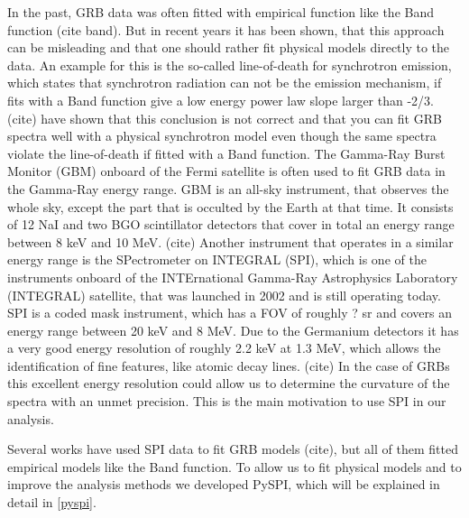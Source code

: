 \documentclass[twocolumn]{aa}
\begin{document}
In the past, GRB data was often fitted with empirical function like the Band function (cite band). But in recent years it has been shown, that this approach can be misleading and that one should rather fit physical models directly to the data. An example for this is the so-called line-of-death for synchrotron emission, which states that synchrotron radiation can not be the emission mechanism, if fits with a Band function give a low energy power law slope larger than -2/3. (cite) have shown that this conclusion is not correct and that you can fit GRB spectra well with a physical synchrotron model even though the same spectra violate the line-of-death if fitted with a Band function.
The Gamma-Ray Burst Monitor (GBM) onboard of the Fermi satellite is often used to fit GRB data in the Gamma-Ray energy range. GBM is an all-sky instrument, that observes the whole sky, except the part that is occulted by the Earth at that time. It consists of 12 NaI and two BGO scintillator detectors that cover in total an energy range between 8 keV and 10 MeV. (cite)
Another instrument that operates in a similar energy range is the SPectrometer on INTEGRAL (SPI), which is one of the instruments onboard of the INTErnational Gamma-Ray Astrophysics Laboratory (INTEGRAL) satellite, that was launched in 2002 and is still operating today. SPI is a coded mask instrument, which has a FOV of roughly ? sr and covers an energy range between 20 keV and 8 MeV. Due to the Germanium detectors it has a very good energy resolution of roughly 2.2 keV at 1.3 MeV, which allows the identification of fine features, like atomic decay lines. (cite) In the case of GRBs this excellent energy resolution could allow us to determine the curvature of the spectra with an unmet precision. This is the main motivation to use SPI in our analysis.

Several works have used SPI data to fit GRB models (cite), but all of them fitted empirical models like the Band function. To allow us to fit physical models and to improve the analysis methods we developed PySPI, which will be explained in detail in \ref{pyspi}.

\end{document}
